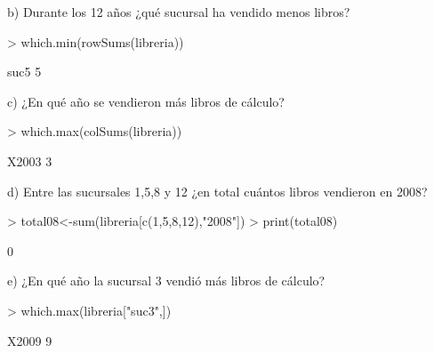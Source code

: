 \documentclass{article}
\begin{document}
b) Durante los 12 años ¿qué sucursal ha vendido menos libros?

\begin{Schunk}
\begin{Sinput}
> which.min(rowSums(libreria))
\end{Sinput}
\begin{Soutput}
suc5 
   5 
\end{Soutput}
\end{Schunk}

c) ¿En qué año se vendieron más libros de cálculo?
\begin{Schunk}
\begin{Sinput}
> which.max(colSums(libreria))
\end{Sinput}
\begin{Soutput}
X2003 
    3 
\end{Soutput}
\end{Schunk}

d) Entre las sucursales 1,5,8 y 12 ¿en total cuántos libros vendieron en 2008?

\begin{Schunk}
\begin{Sinput}
> total08<-sum(libreria[c(1,5,8,12),"2008"])
> print(total08)
\end{Sinput}
\begin{Soutput}
[1] 0
\end{Soutput}
\end{Schunk}

e) ¿En qué año la sucursal 3 vendió más libros de cálculo?
\begin{Schunk}
\begin{Sinput}
> which.max(libreria["suc3",]) 
\end{Sinput}
\begin{Soutput}
X2009 
    9 
\end{Soutput}
\end{Schunk}
\end{document}
